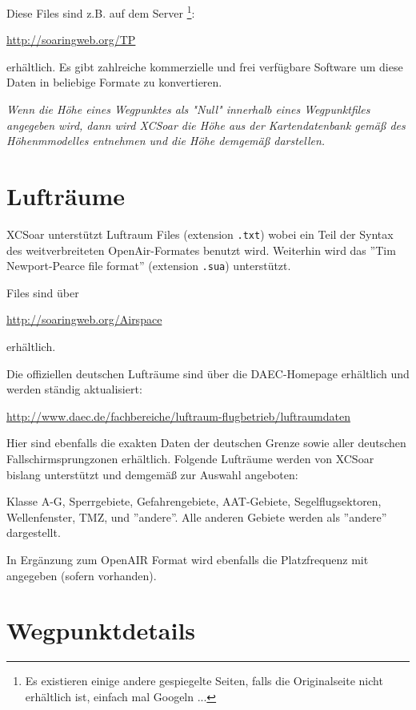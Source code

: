Diese Files sind z.B. auf dem Server \footnote{Es existieren einige andere gespiegelte Seiten, falls die
Originalseite nicht erhältlich ist, einfach mal Googeln ...}:
\begin{center}
\url{http://soaringweb.org/TP}
\end{center}
erhältlich. Es gibt zahlreiche kommerzielle und frei verfügbare Software um diese Daten in beliebige Formate zu
konvertieren.

\achtung \textsl{Wenn die Höhe eines Wegpunktes als "Null" innerhalb eines Wegpunktfiles angegeben
wird, dann wird \textsf{XCSoar} die Höhe aus der Kartendatenbank gemäß des Höhenmmodelles entnehmen und die
Höhe demgemäß darstellen.}


\section{Lufträume}

\textsf{XCSoar} unterstützt Luftraum Files (extension \verb|.txt|) wobei ein Teil der Syntax
des weitverbreiteten OpenAir-Formates benutzt wird. Weiterhin wird das ''Tim Newport-Pearce file format''
(extension \verb|.sua|) unterstützt.

Files sind über
\begin{center}
\url{http://soaringweb.org/Airspace}
\end{center}
 erhältlich.

Die offiziellen deutschen Lufträume sind über die DAEC-Homepage erhältlich und werden ständig
aktualisiert:
\begin{center}
\url{http://www.daec.de/fachbereiche/luftraum-flugbetrieb/luftraumdaten}
\end{center}

Hier sind ebenfalls die exakten Daten der deutschen Grenze sowie aller deutschen Fallschirmsprungzonen
erhältlich. Folgende Lufträume werden von \textsf{XCSoar} bislang unterstützt und demgemäß zur Auswahl angeboten:

Klasse A-G, Sperrgebiete, Gefahrengebiete, AAT-Gebiete, Segelflugsektoren, Wellenfenster, TMZ, und
''andere''.  Alle anderen Gebiete werden als ''andere'' dargestellt.

In Ergänzung zum OpenAIR Format wird ebenfalls die Platzfrequenz mit angegeben (sofern vorhanden).


\section{Wegpunktdetails}\label{sec:airfield-details}

